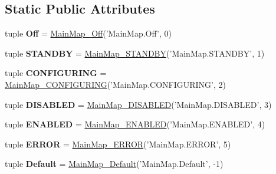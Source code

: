 \subsection*{Static Public Attributes}
\begin{DoxyCompactItemize}
\item 
\hypertarget{classsal_lifecycle__sm_1_1_main_map_aa067cc6e61010a5e1420b1aac6a019f7}{tuple {\bfseries Off} = \hyperlink{classsal_lifecycle__sm_1_1_main_map___off}{Main\-Map\-\_\-\-Off}('Main\-Map.\-Off', 0)}\label{classsal_lifecycle__sm_1_1_main_map_aa067cc6e61010a5e1420b1aac6a019f7}

\item 
\hypertarget{classsal_lifecycle__sm_1_1_main_map_ad16f7e0b2bd7dbb80c39c130c7c633f5}{tuple {\bfseries S\-T\-A\-N\-D\-B\-Y} = \hyperlink{classsal_lifecycle__sm_1_1_main_map___s_t_a_n_d_b_y}{Main\-Map\-\_\-\-S\-T\-A\-N\-D\-B\-Y}('Main\-Map.\-S\-T\-A\-N\-D\-B\-Y', 1)}\label{classsal_lifecycle__sm_1_1_main_map_ad16f7e0b2bd7dbb80c39c130c7c633f5}

\item 
\hypertarget{classsal_lifecycle__sm_1_1_main_map_a1a4bf47c1b43c66a9a758a6f548eeccf}{tuple {\bfseries C\-O\-N\-F\-I\-G\-U\-R\-I\-N\-G} = \hyperlink{classsal_lifecycle__sm_1_1_main_map___c_o_n_f_i_g_u_r_i_n_g}{Main\-Map\-\_\-\-C\-O\-N\-F\-I\-G\-U\-R\-I\-N\-G}('Main\-Map.\-C\-O\-N\-F\-I\-G\-U\-R\-I\-N\-G', 2)}\label{classsal_lifecycle__sm_1_1_main_map_a1a4bf47c1b43c66a9a758a6f548eeccf}

\item 
\hypertarget{classsal_lifecycle__sm_1_1_main_map_af66acbd4e566b358d6d63839f16d338e}{tuple {\bfseries D\-I\-S\-A\-B\-L\-E\-D} = \hyperlink{classsal_lifecycle__sm_1_1_main_map___d_i_s_a_b_l_e_d}{Main\-Map\-\_\-\-D\-I\-S\-A\-B\-L\-E\-D}('Main\-Map.\-D\-I\-S\-A\-B\-L\-E\-D', 3)}\label{classsal_lifecycle__sm_1_1_main_map_af66acbd4e566b358d6d63839f16d338e}

\item 
\hypertarget{classsal_lifecycle__sm_1_1_main_map_a46fab8750ba572fd4e8fd592d56722ee}{tuple {\bfseries E\-N\-A\-B\-L\-E\-D} = \hyperlink{classsal_lifecycle__sm_1_1_main_map___e_n_a_b_l_e_d}{Main\-Map\-\_\-\-E\-N\-A\-B\-L\-E\-D}('Main\-Map.\-E\-N\-A\-B\-L\-E\-D', 4)}\label{classsal_lifecycle__sm_1_1_main_map_a46fab8750ba572fd4e8fd592d56722ee}

\item 
\hypertarget{classsal_lifecycle__sm_1_1_main_map_a999e17223acff64f2ec5d07aca40c373}{tuple {\bfseries E\-R\-R\-O\-R} = \hyperlink{classsal_lifecycle__sm_1_1_main_map___e_r_r_o_r}{Main\-Map\-\_\-\-E\-R\-R\-O\-R}('Main\-Map.\-E\-R\-R\-O\-R', 5)}\label{classsal_lifecycle__sm_1_1_main_map_a999e17223acff64f2ec5d07aca40c373}

\item 
\hypertarget{classsal_lifecycle__sm_1_1_main_map_a27cccc860bf1654f3fc282be9eff2a88}{tuple {\bfseries Default} = \hyperlink{classsal_lifecycle__sm_1_1_main_map___default}{Main\-Map\-\_\-\-Default}('Main\-Map.\-Default', -\/1)}\label{classsal_lifecycle__sm_1_1_main_map_a27cccc860bf1654f3fc282be9eff2a88}

\end{DoxyCompactItemize}


